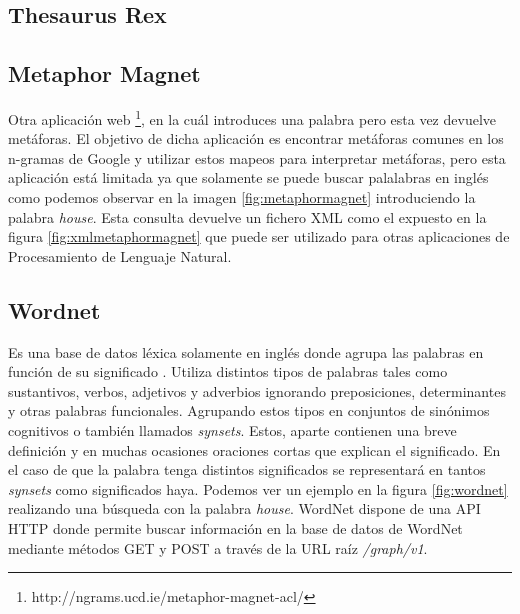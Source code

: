 \subsection{Thesaurus Rex}
\label{cap:subsec:thesaurusrex}


\subsection{Metaphor Magnet}
\label{cap:subsec:metaphormagnet}
Otra aplicación web \footnote{http://ngrams.ucd.ie/metaphor-magnet-acl/}, en la cuál introduces una palabra pero esta vez devuelve metáforas. El objetivo \citep{VealeT2012} de dicha aplicación es encontrar metáforas comunes en los n-gramas de Google y utilizar estos mapeos para interpretar metáforas, pero esta aplicación está limitada ya que solamente se puede buscar palalabras en inglés como podemos observar en la imagen \ref{fig:metaphormagnet} introduciendo la palabra  \textit{house}.
Esta consulta devuelve un fichero XML como el expuesto en la figura \ref{fig:xmlmetaphormagnet} que puede ser utilizado para otras aplicaciones de Procesamiento de Lenguaje Natural.



\subsection{Wordnet}
\label{cap:subsec:wordnet}
Es una base de datos léxica solamente en inglés donde agrupa las palabras en función de su significado \citep{wordnet2010}. Utiliza distintos tipos de palabras tales como sustantivos, verbos, adjetivos y adverbios ignorando preposiciones, determinantes y otras palabras funcionales. Agrupando estos tipos en conjuntos de sinónimos cognitivos o también llamados \textit{synsets}. Estos, aparte contienen una breve definición y en muchas ocasiones oraciones cortas que explican el significado. En el caso de que la palabra tenga distintos significados se representará en tantos \textit{synsets} como significados haya. Podemos ver un ejemplo en la figura \ref{fig:wordnet} realizando una búsqueda con la palabra \textit{house}.
WordNet dispone de una API HTTP donde permite buscar información en la base de datos de WordNet mediante métodos GET y POST a través de la URL raíz \textit{/graph/v1}.
